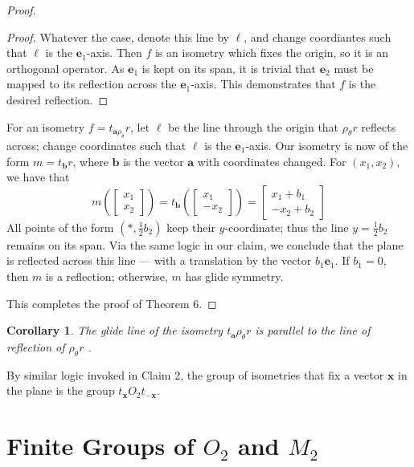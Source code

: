 \documentclass[11pt]{article}
\renewcommand{\vec}[1]{\mathbf{#1}}
\newtheorem{corollary}{Corollary}
\begin{document}
\begin{adjustwidth}{1cm}{}
\begin{proof}
\begin{adjustwidth}{1cm}{}
\begin{proof}
				Whatever the case, denote this line by $\ell$, and change coordiantes such that $\ell$ is the $\vec{e}_{1}$-axis. Then $f$ is an isometry which fixes the origin, so it is an orthogonal operator. As $\vec{e}_{1}$ is kept on its span, it is trivial that $\vec{e}_{2}$ must be mapped to its reflection across the $\vec{e}_{1}$-axis. This demonstrates that $f$ is the desired reflection.
			\end{proof}
		\end{adjustwidth}
		For an isometry $f = t_{\vec{a} \rho_{\theta}} r$, let $\ell$ be the line through the origin that $\rho_{\theta} r$ reflects across; change coordinates such that $\ell$ is the $\vec{e}_{1}$-axis. Our isometry is now of the form $m = t_{\vec{b}} r$, where $\vec{b}$ is the vector $\vec{a}$ with coordinates changed. For $(x_{1}, x_{2})$, we have that
		\[
			m \left( \begin{bmatrix} x_{1} \\ x_{2} \end{bmatrix} \right) = t_{\vec{b}} \left( \begin{bmatrix} x_{1} \\ - x_{2} \end{bmatrix} \right) = \begin{bmatrix} x_{1} + b_{1} \\ - x_{2} + b_{2} \end{bmatrix}
		\]
		All points of the form $(\ast, \tfrac{1}{2} b_{2})$ keep their $y$-coordinate; thus the line $y = \tfrac{1}{2} b_{2}$ remains on its span. Via the same logic in our claim, we conclude that the plane is reflected across this line --- with a translation by the vector $b_{1} \vec{e}_{1}$. If $b_{1} = 0$, then $m$ is a reflection; otherwise, $m$ has glide symmetry.

		This completes the proof of Theorem 6.
	\end{proof}
	\begin{corollary}
		The glide line of the isometry $t_{\vec{a}} \rho_{\theta} r$ is parallel to the line of reflection of $\rho_{\theta} r$ .
	\end{corollary}
\end{adjustwidth}

By similar logic invoked in Claim 2, the group of isometries that fix a vector $\vec{x}$ in the plane is the group $t_{\vec{x}} O_{2} t_{- \vec{x}}$.


\section{Finite Groups of \texorpdfstring{$O_{2}$ and $M_{2}$}{Orthogonal Operators and Isometries on the Plane}}
\end{document}
